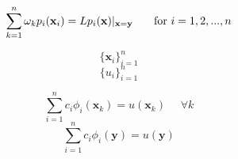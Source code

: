 \documentclass[12pt]{article}
\let\vec\mathbf
\begin{document}
$$
\sum\limits_{k=1}^n \omega_k p_i(\vec{x}_i) = Lp_i(\vec{x}) \vert_{\vec{x}=\vec{y}} \text{\phantom{==} for } i=1,2,...,n
$$

$$
\{\vec{x}_i\}_{i=1}^n
$$
$$
\{u_i\}_{i=1}^n
$$

$$
\sum_{i=1}^n c_i \phi_i(\vec{x}_k) = u(\vec{x}_k) \phantom{=} \forall k
$$
$$
\sum_{i=1}^n c_i \phi_i(\vec{y}) = u(\vec{y})
$$
\end{document}
